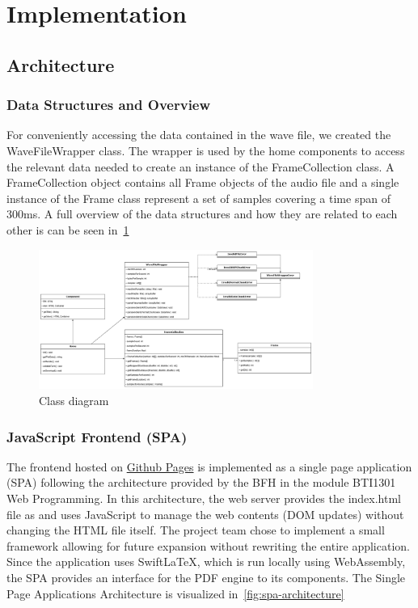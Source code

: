 \section{Implementation}\label{sec:implementation}

\subsection{Architecture}\label{subsec:architecture}

\subsubsection{Data Structures and Overview}
For conveniently accessing the data contained in the wave file, we created the WaveFileWrapper class.
The wrapper is used by the home components to access the relevant data needed to create an instance of the FrameCollection class.
A FrameCollection object contains all Frame objects of the audio file and a single instance of the Frame class represent a set of samples covering a time span of 300ms.
A full overview of the data structures and how they are related to each other is can be seen in~\ref{fig:class-diagram}

\begin{figure}[H]
    \centering
    \includegraphics[width=0.8\textwidth]{../assets/class_diagram.png}
    \caption{Class diagram}\label{fig:class-diagram}
\end{figure}

\subsubsection{JavaScript Frontend (SPA)}
The frontend hosted on \href{https://decibel-threshold-event-displayer.github.io/}{Github Pages} is implemented as a single page application (SPA) following the architecture provided by the BFH in the module BTI1301 Web Programming.
In this architecture, the web server provides the index.html file as and uses JavaScript to manage the web contents (DOM updates) without changing the HTML file itself.
The project team chose to implement a small framework allowing for future expansion without rewriting the entire application.
Since the application uses SwiftLaTeX, which is run locally using WebAssembly, the SPA provides an interface for the PDF engine to its components.
The Single Page Applications Architecture is visualized in~\ref{fig:spa-architecture}

